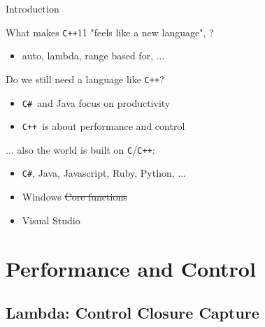 \documentclass[svgnames,smaller]{beamer}
\newcommand*{\cpp}{\texttt{C++}}
\newcommand*{\csharp}{\texttt{C\#}}
\begin{document}
\begin{frame}[fragile]{Introduction}
  \begin{block}{What makes \cpp11 "feels like a new language",
      \citeauthor{stroustrup-think} \cite{stroustrup-think} ?}
    \begin{itemize}
    \item auto, lambda, range based for, ...
    \end{itemize}
  \end{block}

  \begin{alertblock}{Do we still need a language like \cpp ?}
    \begin{itemize}
    \item \csharp\  and Java focus on productivity
    \item \cpp\  is about performance and control
    \end{itemize}
  \end{alertblock}

  ... also the world is built on \texttt{C}/\cpp:
  \begin{itemize}
  \item \csharp, Java, Javascript, Ruby, Python, ...
  \item Windows \sout{Core functions} \cite{sutter-why}
  \item Visual Studio \cite{soft-impl}
  \end{itemize}

\end{frame}

\section{Performance and Control}

\subsection{Lambda: Control Closure Capture}
\end{document}
